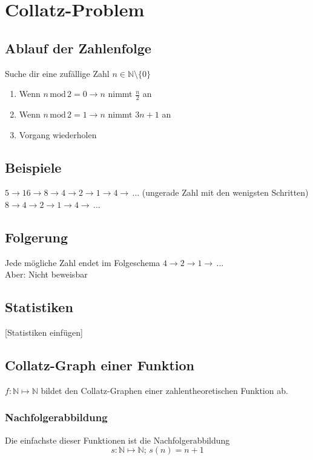 \documentclass{article}
\newcommand{\N}{\mathbb{N}}
\renewcommand{\mod}{\,\mathrm{mod}\,}
\begin{document}
\section{Collatz-Problem}

\subsection{Ablauf der Zahlenfolge}
Suche dir eine zufällige Zahl $n \in \N \setminus \{0\}$
\begin{enumerate}
\item Wenn $n \mod 2 = 0 \rightarrow n$ nimmt $\frac{n}{2}$ an
\item Wenn $n \mod 2 = 1 \rightarrow n$ nimmt $3n + 1$ an
\item Vorgang wiederholen
\end{enumerate}

\subsection{Beispiele}
$5 \rightarrow 16 \rightarrow 8 \rightarrow 4 \rightarrow 2 \rightarrow 1 \rightarrow 4 \rightarrow \, ... $ (ungerade Zahl mit den wenigsten Schritten)\\
$8 \rightarrow 4 \rightarrow 2 \rightarrow 1 \rightarrow 4 \rightarrow \, ...$

\subsection{Folgerung}
Jede mögliche Zahl endet im Folgeschema $4 \rightarrow 2 \rightarrow 1 \rightarrow \, ...$ \\
Aber: Nicht beweisbar

\subsection{Statistiken}
[Statistiken einfügen]


\subsection{Collatz-Graph einer Funktion}
$f: \N \mapsto \N$ bildet den Collatz-Graphen einer zahlentheoretischen Funktion ab. 

\subsubsection{Nachfolgerabbildung}

Die einfachste dieser Funktionen ist die Nachfolgerabbildung
\[s: \N \mapsto \N; \, s(n) = n + 1\]
\end{document}
